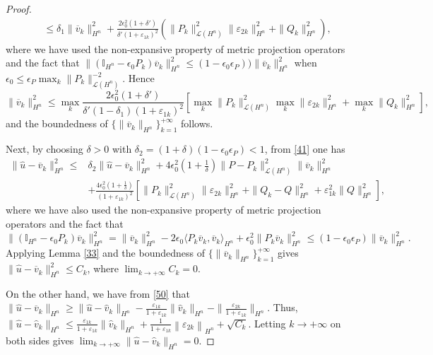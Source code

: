 \documentclass[10pt,a4paper]{amsart}
\begin{document}
\begin{proof}
\begin{align*}
&\le \delta_1\|\overline{v}_k\|_{H^n}^2+\frac{2\epsilon_0^2(1+\delta')}{\delta'(1+\varepsilon_{1k})^2}(\|P_k\|_{\mathcal{L}(H^n)}^2
\|\varepsilon_{2k}\|_{H^n}^2+\|Q_k\|_{H^n}^2),
\end{align*}
where we have used the non-expansive property of metric projection operators and the fact that
$
\|(\mathbb{I}_{H^n}-\epsilon_0P_k)\overline{v}_k\|_{H^n}^2
\leq (1-\epsilon_0\epsilon_P))\|\overline{v}_k\|_{H^n}^2$ when $\epsilon_0\leq \epsilon_P\max_{k}\|P_k\|_{\mathcal{L}(H^n)}^{-2}$.
Hence
$$
\|\overline{v}_k\|_{H^n}^2\leq \max_{k}\frac{2\epsilon_0^2(1+\delta')}{\delta'(1-\delta_1)(1+\varepsilon_{1k})^2}[\max_{k}\|P_k\|_{\mathcal{L}(H^n)}^2\max_{k}\|\varepsilon_{2k}\|_{H^n}^2+\max_{k}\|Q_k\|_{H^n}^2],
$$
and the boundedness of $\{\|\overline{v}_k\|_{H^n}\}_{k=1}^{+\infty}$ follows.

Next, by choosing $\delta>0$ with $\delta_2=(1+\delta)(1-\epsilon_0\epsilon_P)<1$, from \eqref{41} one has
\begin{align*}
\|\widehat{u}-\overline{v}_k\|_{H^n}^2
\leq & \delta_2\|\widehat{u}-\overline{v}_k\|_{H^n}^2+4\epsilon^2_0(1+\frac{1}{\delta})\|P-P_k\|_{\mathcal{L}(H^n)}^2\|\overline{v}_k\|_{H^n}^2\\
&+\frac{4\epsilon^2_0(1+\frac{1}{\delta})}{(1+\varepsilon_{1k})^2}[\|P_k\|_{\mathcal{L}(H^n)}^2\|\varepsilon_{2k}\|_{H^n}^2+\|Q_k-Q\|_{H^n}^2+\varepsilon^2_{1k}\|Q\|_{H^n}^2],
\end{align*}
where we have also used the non-expansive property of metric projection operators and the fact that 
$\|(\mathbb{I}_{H^n}-\epsilon_0P_k)\overline{v}_k\|_{H^n}^2
=\|\overline{v}_k\|_{H^n}^2-2\epsilon_0\langle P_k\overline{v}_k,\overline{v}_k\rangle_{H^n}+
\epsilon_0^2\|P_k\overline{v}_k\|_{H^n}^2
\leq (1-\epsilon_0\epsilon_P)\|\overline{v}_k\|_{H^n}^2.
$
 Applying Lemma \ref{33} and the boundedness of $\{\|\overline{v}_k\|_{H^n}\}_{k=1}^{+\infty}$ gives
$\|\widehat{u}-\overline{v}_k\|_{H^n}^2\leq C_k$,
 where $\lim_{k\rightarrow+\infty}C_k=0$.

On the other hand, we have from \eqref{50} that
$
\|\widehat{u}-\overline{v}_k\|_{H^n}
\geq\|\widehat{u}-\widehat{v}_k\|_{H^n}-\frac{\varepsilon_{1k}}{1+\varepsilon_{1k}}\|\widehat{v}_k\|_{H^n}
-\|\frac{\varepsilon_{2k}}{1+\varepsilon_{1k}}\|_{H^n}.
$
Thus, $\|\widehat{u}-\widehat{v}_k\|_{H^n}\leq\frac{\varepsilon_{1k}}{1+\varepsilon_{1k}}\|\widehat{v}_k\|_{H^n}
+\frac{1}{1+\varepsilon_{1k}}\left\|\varepsilon_{2k}\right\|_{H^n}+\sqrt{C_k}.$
Letting $k\rightarrow+\infty$ on both sides gives $\lim_{k\rightarrow+\infty}\|\widehat{u}-\widehat{v}_k\|_{H^n}=0$.


\end{proof}
\end{document}
